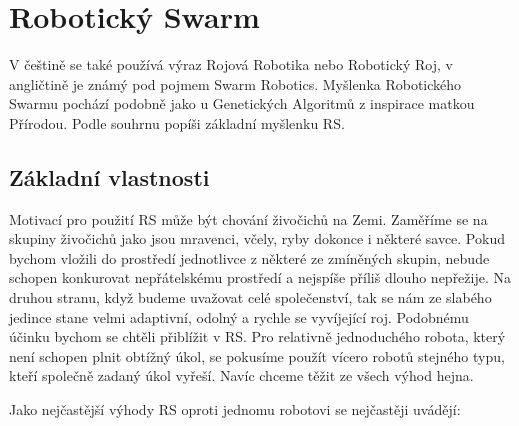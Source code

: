 
\chapter{Robotický Swarm}
V češtině se také používá výraz Rojová Robotika nebo Robotický Roj, v angličtině je známý pod pojmem Swarm Robotics. Myšlenka Robotického Swarmu pochází podobně jako u Genetických Algoritmů z inspirace matkou Přírodou. Podle souhrnu \cite{swarmRobotic} popíši základní myšlenku RS.
\section{Základní vlastnosti}
Motivací pro použití RS může být chování živočichů na Zemi. Zaměříme se na skupiny živočichů jako jsou mravenci, včely, ryby dokonce i některé savce. Pokud bychom vložili do prostředí jednotlivce z některé ze zmíněných skupin, nebude schopen konkurovat nepřátelskému prostředí a nejspíše příliš dlouho nepřežije. Na druhou stranu, když budeme uvažovat celé společenství, tak se nám ze slabého jedince stane velmi adaptivní, odolný a rychle se vyvíjející roj. Podobnému účinku bychom se chtěli přiblížit v RS. Pro relativně jednoduchého robota, který není schopen plnit obtížný úkol, se pokusíme použít vícero robotů stejného typu, kteří společně zadaný úkol vyřeší. Navíc chceme těžit ze všech výhod hejna. \par
Jako nejčastější výhody RS oproti jednomu robotovi se nejčastěji uvádějí:
